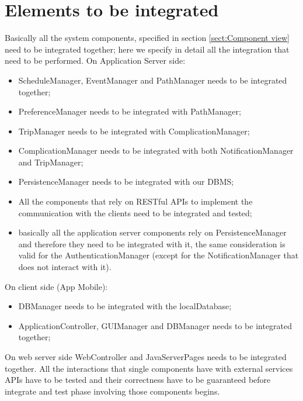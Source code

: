 \section{Elements to be integrated}
Basically all the system components, specified in section \ref{sect:Component view} need to be integrated together; here we specify in detail all the integration that need to be performed.
On Application Server side:
\begin{itemize}
	\item ScheduleManager, EventManager and PathManager needs to be integrated together;
	\item PreferenceManager needs to be integrated with PathManager;
	\item TripManager needs to be integrated with ComplicationManager;
	\item ComplicationManager needs to be integrated with both NotificationManager and TripManager;
	\item PersistenceManager needs to be integrated with our DBMS;
	\item All the components that rely on RESTful APIs to implement the communication with the clients need to be integrated and tested;
	\item basically all the application server components rely on PersistenceManager and therefore they need to be integrated with it, the same consideration is valid for the AuthenticationManager (except for the NotificationManager that does not interact with it).
\end{itemize}
On client side (App Mobile):
\begin{itemize}
	\item DBManager needs to be integrated with the localDatabase;
	\item ApplicationController, GUIManager and DBManager needs to be integrated together;
\end{itemize}
On web server side WebController and JavaServerPages needs to be integrated together.
All the interactions that single components have with external services APIs have to be tested and their correctness have to be guaranteed before integrate and test phase involving those components begins.

